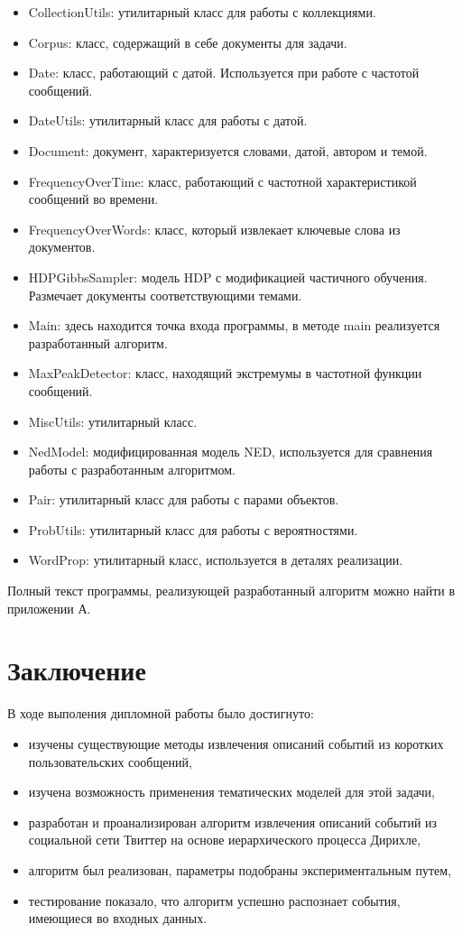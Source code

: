 \documentclass[14pt,a4paper,oneside]{extarticle}
\begin{document}
	\begin{itemize}
\item CollectionUtils: утилитарный класс для работы с коллекциями.
\item Corpus: класс, содержащий в себе документы для задачи.
\item Date: класс, работающий с датой. Используется при работе с частотой сообщений.
\item DateUtils: утилитарный класс для работы с датой.
\item Document: документ, характеризуется словами, датой, автором и темой.
\item FrequencyOverTime: класс, работающий с частотной характеристикой сообщений во времени.
\item FrequencyOverWords: класс, который извлекает ключевые слова из документов.
\item HDPGibbsSampler: модель HDP с модификацией частичного обучения. Размечает документы соответствующими темами.
\item Main: здесь находится точка входа программы, в методе main реализуется разработанный алгоритм.
\item MaxPeakDetector: класс, находящий экстремумы в частотной функции сообщений.
\item MiscUtils: утилитарный класс.
\item NedModel: модифицированная модель NED, используется для сравнения работы с разработанным алгоритмом.
\item Pair: утилитарный класс для работы с парами объектов.
\item ProbUtils: утилитарный класс для работы с вероятностями.
\item WordProp: утилитарный класс, используется в деталях реализации.
\end{itemize}

Полный текст программы, реализующей разработанный алгоритм можно найти в приложении А.
	
	
	\section*{Заключение}
	В ходе выполения дипломной работы было достигнуто:
	\begin{itemize}
	\item изучены существующие методы извлечения описаний событий из коротких пользовательских сообщений,
	\item изучена возможность применения тематических моделей для этой задачи,
	\item разработан и проанализирован алгоритм извлечения описаний событий из социальной сети Твиттер на основе иерархического процесса Дирихле,
	\item алгоритм был реализован, параметры подобраны экспериментальным путем,
	\item тестирование показало, что алгоритм успешно распознает события, имеющиеся во входных данных.
	\end{itemize}
	
\end{document}
